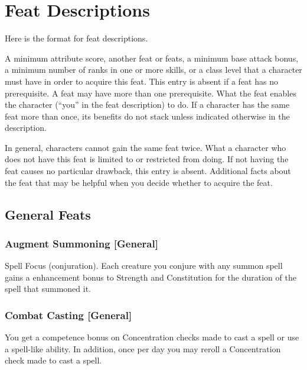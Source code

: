 \section{Feat Descriptions}
Here is the format for feat descriptions.

 A minimum attribute score, another feat or feats, a minimum base attack bonus, a minimum number of ranks in one or more skills, or a class level that a character must have in order to acquire this feat. This entry is absent if a feat has no prerequisite. A feat may have more than one prerequisite.
 What the feat enables the character (``you'' in the feat description) to do. If a character has the same feat more than once, its benefits do not stack unless indicated otherwise in the description.
\par In general, characters cannot gain the same feat twice.
 What a character who does not have this feat is limited to or restricted from doing. If not having the feat causes no particular drawback, this entry is absent.
 Additional facts about the feat that may be helpful when you decide whether to acquire the feat.

\subsection{General Feats}

\subsubsection{Augment Summoning [General]}
 Spell Focus (conjuration).
 Each creature you conjure with any summon spell gains a  enhancement bonus to Strength and Constitution for the duration of the spell that summoned it.

\subsubsection{Combat Casting [General]}
 You get a  competence bonus on Concentration checks made to cast a spell or use a spell-like ability. In addition, once per day you may reroll a Concentration check made to cast a spell.

